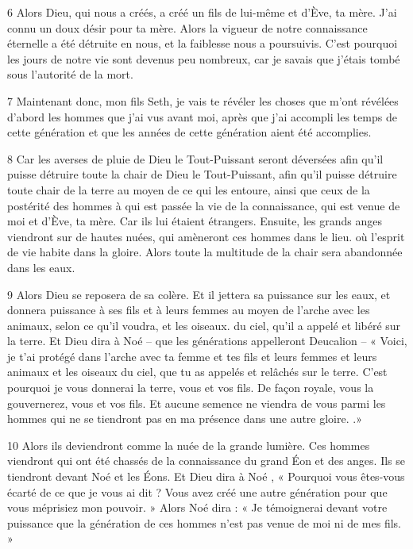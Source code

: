 \par 6 Alors Dieu, qui nous a créés, a créé un fils de lui-même et d'Ève, ta mère. J'ai connu un doux désir pour ta mère. Alors la vigueur de notre connaissance éternelle a été détruite en nous, et la faiblesse nous a poursuivis. C'est pourquoi les jours de notre vie sont devenus peu nombreux, car je savais que j'étais tombé sous l'autorité de la mort.

\par 7 Maintenant donc, mon fils Seth, je vais te révéler les choses que m'ont révélées d'abord les hommes que j'ai vus avant moi, après que j'ai accompli les temps de cette génération et que les années de cette génération aient été accomplies.

\par 8 Car les averses de pluie de Dieu le Tout-Puissant seront déversées afin qu'il puisse détruire toute la chair de Dieu le Tout-Puissant, afin qu'il puisse détruire toute chair de la terre au moyen de ce qui les entoure, ainsi que ceux de la postérité des hommes à qui est passée la vie de la connaissance, qui est venue de moi et d'Ève, ta mère. Car ils lui étaient étrangers. Ensuite, les grands anges viendront sur de hautes nuées, qui amèneront ces hommes dans le lieu. où l'esprit de vie habite dans la gloire. Alors toute la multitude de la chair sera abandonnée dans les eaux.

\par 9 Alors Dieu se reposera de sa colère. Et il jettera sa puissance sur les eaux, et donnera puissance à ses fils et à leurs femmes au moyen de l'arche avec les animaux, selon ce qu'il voudra, et les oiseaux. du ciel, qu'il a appelé et libéré sur la terre. Et Dieu dira à Noé – que les générations appelleront Deucalion – « Voici, je t’ai protégé dans l’arche avec ta femme et tes fils et leurs femmes et leurs animaux et les oiseaux du ciel, que tu as appelés et relâchés sur le terre. C'est pourquoi je vous donnerai la terre, vous et vos fils. De façon royale, vous la gouvernerez, vous et vos fils. Et aucune semence ne viendra de vous parmi les hommes qui ne se tiendront pas en ma présence dans une autre gloire. .»

\par 10 Alors ils deviendront comme la nuée de la grande lumière. Ces hommes viendront qui ont été chassés de la connaissance du grand Éon et des anges. Ils se tiendront devant Noé et les Éons. Et Dieu dira à Noé , « Pourquoi vous êtes-vous écarté de ce que je vous ai dit ? Vous avez créé une autre génération pour que vous méprisiez mon pouvoir. » Alors Noé dira : « Je témoignerai devant votre puissance que la génération de ces hommes n'est pas venue de moi ni de mes fils. »

